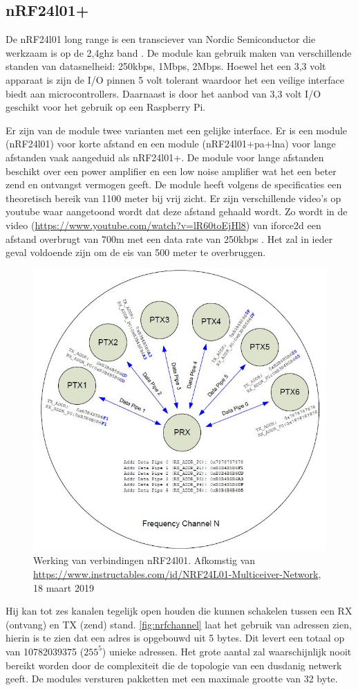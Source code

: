 \documentclass[a4paper, 11pt, oneside]{report}
\begin{document}
\subsection{nRF24l01+}\label{sec:nrf24l01}
De nRF24l01 long range is een transciever van Nordic Semiconductor die werkzaam is op de 2,4ghz band \cite{nRFspec}.
De module kan gebruik maken van verschillende standen van datasnelheid: 250kbps, 1Mbps, 2Mbps.
Hoewel het een 3,3 volt apparaat is zijn de I/O pinnen 5 volt tolerant waardoor het een veilige interface biedt aan microcontrollers. Daarnaast is door het aanbod van 3,3 volt I/O geschikt voor het gebruik op een Raspberry Pi.

Er zijn van de module twee varianten met een gelijke interface. 
Er is een module (nRF24l01) voor korte afstand en een module (nRF24l01+pa+lna) voor lange afstanden vaak aangeduid als nRF24l01+.
De module voor lange afstanden beschikt over een power amplifier en een low noise amplifier wat het een beter zend en ontvangst vermogen geeft.
De module heeft volgens de specificaties een theoretisch bereik van 1100 meter bij vrij zicht.
Er zijn verschillende video's op youtube waar aangetoond wordt dat deze afstand gehaald wordt.
Zo wordt in de video (\href{https://www.youtube.com/watch?v=lR60toEjHl8}{https://www.youtube.com/watch?v=lR60toEjHl8}) van iforce2d een afstand overbrugt van 700m met een data rate van 250kbps \cite{nrfAfstand}.
Het zal in ieder geval voldoende zijn om de eis van 500 meter te overbruggen.  

\begin{figure}[H]
	\begin{center}\includegraphics[width=0.4\linewidth]{Afbeeldingen/nrfMulticiever.jpg}\end{center}
	\caption{Werking van verbindingen nRF24l01. Afkomstig van \href{https://www.instructables.com/id/NRF24L01-Multiceiver-Network}{https://www.instructables.com/id/NRF24L01-Multiceiver-Network}, 18 maart 2019}
	\label{fig:nrfchannel}
\end{figure}
Hij kan tot zes kanalen tegelijk open houden die kunnen schakelen tussen een RX (ontvang) en TX (zend) stand. 
\autoref{fig:nrfchannel} laat het gebruik van adressen zien, hierin is te zien dat een adres is opgebouwd uit 5 bytes.
Dit levert een totaal op van 10782039375 ($255^{5}$) unieke adressen.
Het grote aantal zal waarschijnlijk nooit bereikt worden door de complexiteit die de topologie van een dusdanig netwerk geeft.
De modules versturen pakketten met een maximale grootte van 32 byte.
\end{document}
